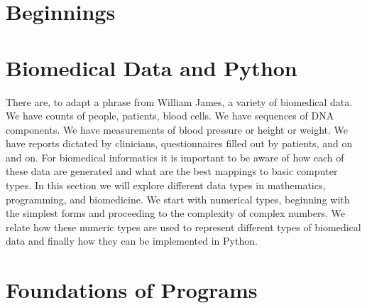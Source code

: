 \documentclass[10pt]{book}
\begin{document}
\fi





\mainmatter

\part{Beginnings}





\part{Biomedical Data and Python}

There are, to adapt a phrase from William James, a variety of biomedical data. We have counts of people, patients, blood cells. We have sequences of DNA components. We have measurements of blood pressure or height or weight. We have reports dictated by clinicians, questionnaires filled out by patients, and on and on. For biomedical informatics it is important to be aware of how each of these data are generated and what are the best mappings to basic computer types. In this section we will explore different data types in mathematics, programming, and biomedicine. We start with numerical types, beginning with the simplest forms and proceeding to the complexity of complex numbers. We relate how these numeric types are used to represent different types of biomedical data and finally how they can be implemented in Python.













\part{Foundations of Programs}











\end{document}
